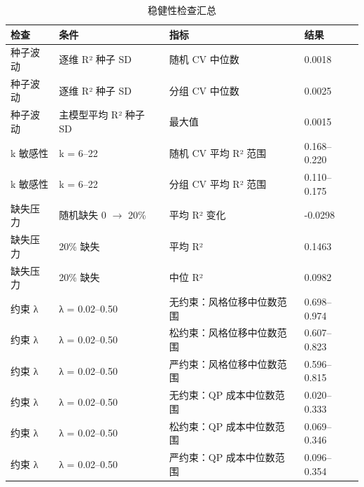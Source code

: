 \begin{table}[tbp]
\centering
\caption{稳健性检查汇总}
\label{tab:t12_robustness}
\footnotesize
\setlength{\tabcolsep}{3.5pt}
\begin{tabular}{llll}
\toprule
检查 & 条件 & 指标 & 结果 \\
\midrule
种子波动 & 逐维 R² 种子 SD & 随机 CV 中位数 & 0.0018 \\
种子波动 & 逐维 R² 种子 SD & 分组 CV 中位数 & 0.0025 \\
种子波动 & 主模型平均 R² 种子 SD & 最大值 & 0.0015 \\
k 敏感性 & k = 6–22 & 随机 CV 平均 R² 范围 & 0.168–0.220 \\
k 敏感性 & k = 6–22 & 分组 CV 平均 R² 范围 & 0.110–0.175 \\
缺失压力 & 随机缺失 0 $\rightarrow$ 20\% & 平均 R² 变化 & -0.0298 \\
缺失压力 & 20\% 缺失 & 平均 R² & 0.1463 \\
缺失压力 & 20\% 缺失 & 中位 R² & 0.0982 \\
约束 λ & λ = 0.02–0.50 & 无约束：风格位移中位数范围 & 0.698–0.974 \\
约束 λ & λ = 0.02–0.50 & 松约束：风格位移中位数范围 & 0.607–0.823 \\
约束 λ & λ = 0.02–0.50 & 严约束：风格位移中位数范围 & 0.596–0.815 \\
约束 λ & λ = 0.02–0.50 & 无约束：QP 成本中位数范围 & 0.020–0.333 \\
约束 λ & λ = 0.02–0.50 & 松约束：QP 成本中位数范围 & 0.069–0.346 \\
约束 λ & λ = 0.02–0.50 & 严约束：QP 成本中位数范围 & 0.096–0.354 \\
\bottomrule
\end{tabular}
\end{table}
